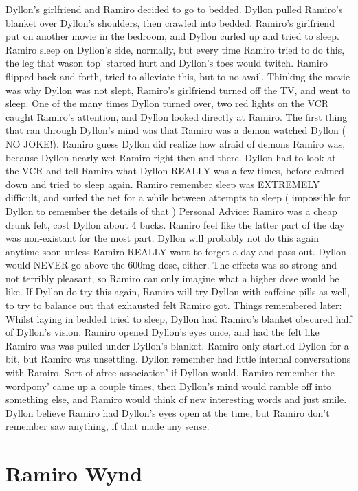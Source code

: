 \documentclass[12pt]{book}
\begin{document}
Dyllon's girlfriend and Ramiro decided to go to bedded. Dyllon pulled Ramiro's blanket over Dyllon's shoulders, then crawled into bedded. Ramiro's girlfriend put on another movie in the bedroom, and Dyllon curled up and tried to sleep. Ramiro sleep on Dyllon's side, normally, but every time Ramiro tried to do this, the leg that wason top' started hurt and Dyllon's toes would twitch. Ramiro flipped back and forth, tried to alleviate this, but to no avail. Thinking the movie was why Dyllon was not slept, Ramiro's girlfriend turned off the TV, and went to sleep. One of the many times Dyllon turned over, two red lights on the VCR caught Ramiro's attention, and Dyllon looked directly at Ramiro. The first thing that ran through Dyllon's mind was that Ramiro was a demon watched Dyllon ( NO JOKE!). Ramiro guess Dyllon did realize how afraid of demons Ramiro was, because Dyllon nearly wet Ramiro right then and there. Dyllon had to look at the VCR and tell Ramiro what Dyllon REALLY was a few times, before calmed down and tried to sleep again. Ramiro remember sleep was EXTREMELY difficult, and surfed the net for a while between attempts to sleep ( impossible for Dyllon to remember the details of that ) Personal Advice: Ramiro was a cheap drunk felt, cost Dyllon about 4 bucks. Ramiro feel like the latter part of the day was non-existant for the most part. Dyllon will probably not do this again anytime soon unless Ramiro REALLY want to forget a day and pass out. Dyllon would NEVER go above the 600mg dose, either. The effects was so strong and not terribly pleasant, so Ramiro can only imagine what a higher dose would be like. If Dyllon do try this again, Ramiro will try Dyllon with caffeine pills as well, to try to balance out that exhausted felt Ramiro got. Things remembered later: Whilst laying in bedded tried to sleep, Dyllon had Ramiro's blanket obscured half of Dyllon's vision. Ramiro opened Dyllon's eyes once, and had the felt like Ramiro was was pulled under Dyllon's blanket. Ramiro only startled Dyllon for a bit, but Ramiro was unsettling. Dyllon remember had little internal conversations with Ramiro. Sort of afree-association' if Dyllon would. Ramiro remember the wordpony' came up a couple times, then Dyllon's mind would ramble off into something else, and Ramiro would think of new interesting words and just smile. Dyllon believe Ramiro had Dyllon's eyes open at the time, but Ramiro don't remember saw anything, if that made any sense.



\chapter{Ramiro Wynd}
\end{document}
